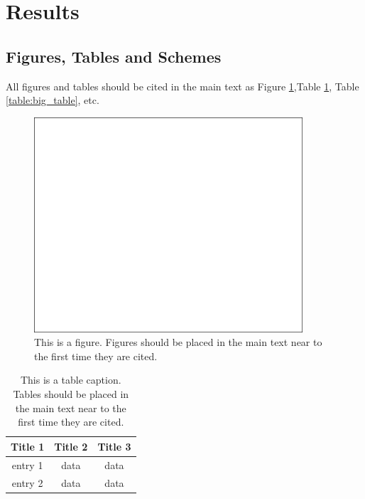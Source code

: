 \section{Results}

\blindtext %

\subsection{Figures, Tables and Schemes}

All figures and tables should be cited in the main text as Figure \ref{figure:example_figure},Table \ref{table:table}, Table \ref{table:big_table}, etc.

\begin{figure}[H]
\label{figure:example_figure}
\centering
\includegraphics[width=10cm]{figures/graphical_abstract.png}
\caption{This is a figure. Figures should be placed in the main text near to the first time they are cited.}
\end{figure}   
 

\begin{table}[H]
\label{table:table}
\caption{This is a table caption. Tables should be placed in the main text near to the first time they are cited.}
\centering
\begin{tabular}{ccc}
\toprule
\textbf{Title 1}	& \textbf{Title 2}	& \textbf{Title 3}\\
\midrule
entry 1		& data			& data\\
entry 2		& data			& data\\
\bottomrule
\end{tabular}
\end{table}



